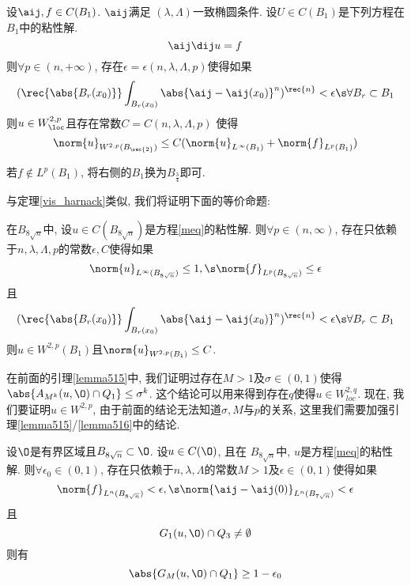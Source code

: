 \begin{theorem}
    设$\aij, f \in C(B_1)$.  $\aij$满足 $(\lambda, \Lambda)$一致椭圆条件.  设$U \in C(B_1)$是下列方程在$B_1$中的粘性解.  
    \begin{equation} \label{meq}
        \aij \dij u =f
    \end{equation}
    则$\forall p \in (n, +\infty)$, 存在$\epsilon =\epsilon(n, \lambda, \Lambda, p)$使得如果
    \begin{equation}
        (\rec{\abs{B_r(x_0)}}\int_{B_r(x_0)}\abs{\aij -\aij(x_0)}^n)^\rec{n} < \epsilon \s \forall B_r \subset B_1
    \end{equation}
    则$u \in W^{2, p}_\loc$且存在常数$C=C(n, \lambda, \Lambda, p)$ 使得
    \begin{equation}
        \norm{u}_{W^{2, p}(B_\rec{2})} \le C(\norm{u}_{L^\infty(B_1)}+\norm{f}_{L^p(B_1)})
    \end{equation}
\end{theorem}
\begin{remark}
    若$f \notin L^p(B_1)$, 将右侧的$B_1$换为$B_{\frac{3}{4}}$即可.  
\end{remark}
与定理\eqref{vis_harnack}类似, 我们将证明下面的等价命题:
\begin{theorem}
    在$B_{8\sqrt{n}}$中, 设$u \in C(B_{8\sqrt{n}})$是方程\eqref{meq}的粘性解.  则$\forall p \in (n, \infty)$, 存在只依赖于$n, \lambda, \Lambda, p$的常数$\epsilon, C$使得如果
    \begin{equation}
        \norm{u}_{L^\infty(B_{8\sqrt{n}})} \le 1, \s \norm{f}_{L^p(B_{8\sqrt{n}})} \le \epsilon
    \end{equation}
    且
    \begin{equation}
        (\rec{\abs{B_r(x_0)}}\int_{B_r(x_0)}\abs{\aij -\aij(x_0)}^n)^\rec{n} < \epsilon \s \forall B_r \subset B_1
    \end{equation}
    则$u \in W^{2, p}(B_1)$且$\norm{u}_{W^{2, p}(B_1)} \le C$.  
\end{theorem}
在前面的引理\eqref{lemma515}中, 我们证明过存在$M>1$及$\sigma\in (0, 1)$使得$\abs{A_{M^k}(u, \O)\cap Q_1} \le \sigma^k$.  这个结论可以用来得到存在$q$使得$u \in W^{2, q}_{loc}$.  现在, 我们要证明$u\in W^{2, p}$, 由于前面的结论无法知道$\sigma, M$与$p$的关系, 这里我们需要加强引理\eqref{lemma515}/\eqref{lemma516}中的结论.  
\begin{lemma} \label{lemma524}
    设$\O$是有界区域且$B_{8\sqrt{n}}\subset \O$.  设$u \in C(\O)$, 且在 $B_{8\sqrt{n}}$中, $u$是方程\eqref{meq}的粘性解.  则$\forall \epsilon_0 \in (0, 1)$, 存在只依赖于$n, \lambda, \Lambda$的常数$M>1$及$\epsilon \in (0, 1)$使得如果 
    \begin{equation}
        \norm{f}_{L^n(B_{8\sqrt{n}})} < \epsilon, \s \norm{\aij-\aij(0)}_{L^n(B_{7\sqrt{n}})} < \epsilon
    \end{equation}
    且
    \begin{equation}
        G_1(u, \O) \cap Q_3 \ne \emptyset
    \end{equation}
    则有
    \begin{equation}
        \abs{G_M(u, \O) \cap Q_1} \ge 1-\epsilon_0
    \end{equation}
\end{lemma}
